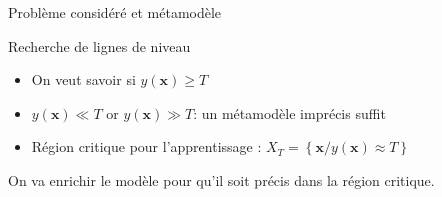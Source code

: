 \begin{frame}{Problème considéré et métamodèle}

\begin{block}{Recherche de lignes de niveau}
\begin{itemize}
 \item On veut savoir si $y(\mathbf{x}) \geq T$
  \item $y(\mathbf{x}) \ll T$ or $y(\mathbf{x}) \gg T$: un métamodèle imprécis suffit
 \item Région critique pour l'apprentissage : $X_T = \left\{ \mathbf{x} / y(\mathbf{x}) \approx T \right\}$
\end{itemize}
\end{block}

On va enrichir le modèle pour qu'il soit précis dans la région critique.
\end{frame}

